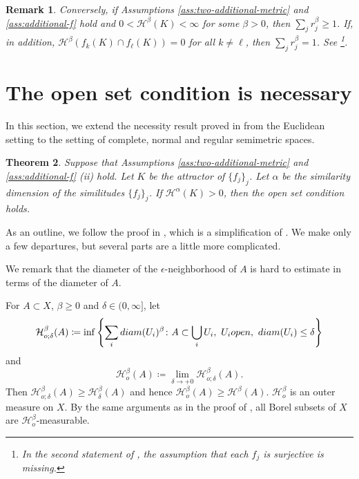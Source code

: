 \documentclass[10pt,a4paper]{amsart}
\newtheorem{Thm}{Theorem}[section]
\newtheorem{Rem}[Thm]{Remark}
\begin{document}
\begin{Rem}
Conversely, if  Assumptions \ref{ass:two-additional-metric} and \ref{ass:additional-f}  hold and $0 < \mathcal{H}^{\beta}(K) < \infty$ for some $\beta > 0$, 
then $\sum_{j} r_j^{\beta} \ge 1$. 
If, in addition, $\mathcal{H}^{\beta}(f_k (K) \cap f_{\ell}(K)) = 0$ for all $k \ne \ell$, then $\sum_{j} r_j^{\beta} = 1$. 
See \cite[Theorem 3]{BessenyeiPenzes2022}\footnote{In the second statement of \cite[Theorem 3]{BessenyeiPenzes2022}, the assumption that each $f_j$ is surjective is missing.}. 
\end{Rem}



\section{The open set condition is necessary}\label{sec:osc}

In this section, we extend the necessity result proved in \cite{Schief1994} from the Euclidean setting to the setting of complete, normal and regular semimetric spaces.  

\begin{Thm}\label{thm:osc-necessary}
Suppose that Assumptions \ref{ass:two-additional-metric} and \ref{ass:additional-f} (ii) hold. 
Let $K$ be the attractor of $\{f_j\}_j$. 
Let $\alpha$ be the similarity dimension of the similitudes $\{f_j\}_j$. 
If $\mathcal{H}^{\alpha}(K) > 0$, then the open set condition holds.  
\end{Thm}


As an outline, we follow the proof in \cite[Section 9.6]{BishopPeres2017}, which is a simplification of  \cite{Schief1994}. 
We make only a few departures, but several parts are a little more complicated. 


We remark that the diameter of the $\epsilon$-neighborhood of $A$ is hard to estimate in terms of the diameter of $A$. 

For $A  \subset X$, $\beta \ge 0$ and $\delta \in (0, \infty]$, let 
\[ \mathcal{H}^{\beta}_{o;\delta}(A) \coloneqq \inf\left\{\sum_i \textup{diam}(U_i)^{\beta}  \colon A \subset \bigcup_i U_i, \ U_i \textup{ open}, \ \textup{diam}(U_i) \le \delta \right\}  \] 
and 
\[ \mathcal{H}^{\beta}_{o}(A) \coloneqq \lim_{\delta \to +0} \mathcal{H}^{\beta}_{o;\delta}(A). \] 
Then $\mathcal{H}^{\beta}_{o;\delta}(A) \ge \mathcal{H}^{\beta}_{\delta}(A)$ and hence $\mathcal{H}^{\beta}_{o}(A) \ge \mathcal{H}^{\beta}(A)$. 
$\mathcal{H}^{\beta}_{o}$ is an outer measure on $X$. 
By the same arguments as in the proof of  \cite[Lemma 11]{BessenyeiPenzes2022}, all Borel subsets of $X$ are $\mathcal{H}^{\beta}_{o}$-measurable. 
\end{document}
